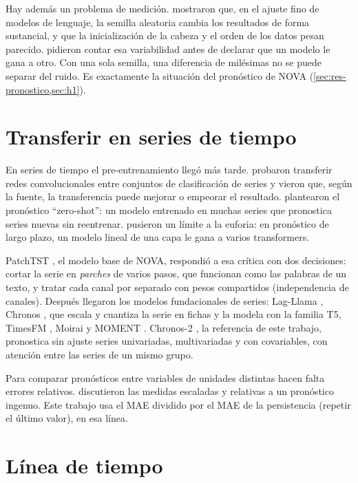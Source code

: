 Hay además un problema de medición. \textcite{dodge2020} mostraron que, en el ajuste fino de modelos de lenguaje, la
semilla aleatoria cambia los resultados de forma sustancial, y que la inicialización de la cabeza y el orden de los
datos pesan parecido. \textcite{bouthillier2021} pidieron contar esa variabilidad antes de declarar que un modelo le
gana a otro. Con una sola semilla, una diferencia de milésimas no se puede separar del ruido. Es exactamente la
situación del pronóstico de NOVA (\cref{sec:res-pronostico,sec:h1}).

\section{Transferir en series de tiempo}

En series de tiempo el pre-entrenamiento llegó más tarde. \textcite{fawaz2018} probaron transferir redes
convolucionales entre conjuntos de clasificación de series y vieron que, según la fuente, la transferencia puede
mejorar o empeorar el resultado. \textcite{oreshkin2021} plantearon el pronóstico \enquote{zero-shot}: un modelo
entrenado en muchas series que pronostica series nuevas sin reentrenar. \textcite{zeng2023} pusieron un límite a la
euforia: en pronóstico de largo plazo, un modelo lineal de una capa le gana a varios transformers.

PatchTST \parencite{nie2023}, el modelo base de NOVA, respondió a esa crítica con dos decisiones: cortar la serie en
\emph{parches} de varios pasos, que funcionan como las palabras de un texto, y tratar cada canal por separado con
pesos compartidos (independencia de canales). Después llegaron los modelos fundacionales de series:
Lag-Llama \parencite{rasul2023}, Chronos \parencite{ansari2024}, que escala y cuantiza la serie en fichas y la modela
con la familia T5, TimesFM \parencite{das2024}, Moirai \parencite{woo2024} y MOMENT \parencite{goswami2024}.
Chronos-2 \parencite{ansari2025}, la referencia de este trabajo, pronostica sin ajuste series univariadas,
multivariadas y con covariables, con atención entre las series de un mismo grupo.

Para comparar pronósticos entre variables de unidades distintas hacen falta errores relativos.
\textcite{hyndman2006} discutieron las medidas escaladas y relativas a un pronóstico ingenuo. Este trabajo usa el MAE
dividido por el MAE de la persistencia (repetir el último valor), en esa línea.

\section{Línea de tiempo}

